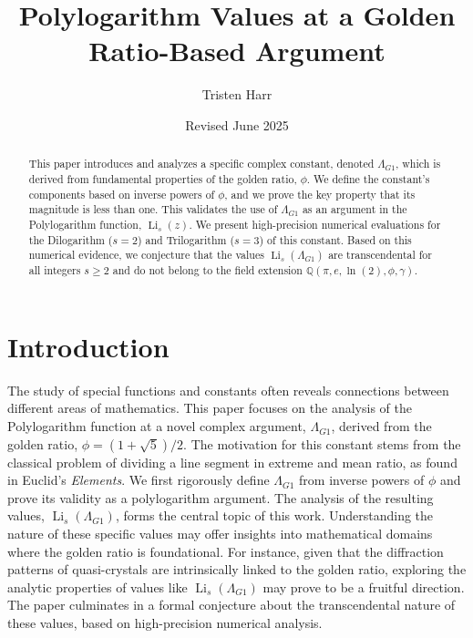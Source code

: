 \documentclass{amsart}
\theoremstyle{plain}
\theoremstyle{definition}
\theoremstyle{remark}
\DeclareMathOperator{\Li}{Li} %
\newcommand{\LambdaG}{\Lambda_{G1}}
\begin{document}
\title[Polylogarithms at a Golden Ratio Argument]{Polylogarithm Values at a Golden Ratio-Based Argument}
\author{Tristen Harr}
\date{Revised June 2025}

\begin{abstract}
This paper introduces and analyzes a specific complex constant, denoted $\LambdaG$, which is derived from fundamental properties of the golden ratio, $\phi$. We define the constant's components based on inverse powers of $\phi$, and we prove the key property that its magnitude is less than one. This validates the use of $\LambdaG$ as an argument in the Polylogarithm function, $\Li_s(z)$. We present high-precision numerical evaluations for the Dilogarithm ($s=2$) and Trilogarithm ($s=3$) of this constant. Based on this numerical evidence, we conjecture that the values $\Li_s(\LambdaG)$ are transcendental for all integers $s \ge 2$ and do not belong to the field extension $\mathbb{Q}(\pi, e, \ln(2), \phi, \gamma)$.
\end{abstract}

\maketitle

\section{Introduction}
The study of special functions and constants often reveals connections between different areas of mathematics. This paper focuses on the analysis of the Polylogarithm function at a novel complex argument, $\LambdaG$, derived from the golden ratio, $\phi = (1+\sqrt{5})/2$. The motivation for this constant stems from the classical problem of dividing a line segment in extreme and mean ratio, as found in Euclid's \textit{Elements}. We first rigorously define $\LambdaG$ from inverse powers of $\phi$ and prove its validity as a polylogarithm argument. The analysis of the resulting values, $\Li_s(\LambdaG)$, forms the central topic of this work. Understanding the nature of these specific values may offer insights into mathematical domains where the golden ratio is foundational. For instance, given that the diffraction patterns of quasi-crystals are intrinsically linked to the golden ratio, exploring the analytic properties of values like $\Li_s(\LambdaG)$ may prove to be a fruitful direction. The paper culminates in a formal conjecture about the transcendental nature of these values, based on high-precision numerical analysis.
\end{document}
